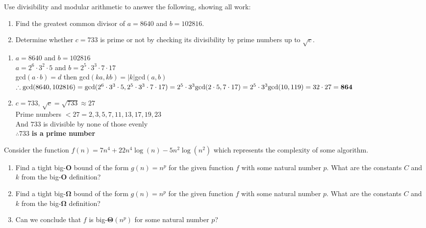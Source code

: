 \documentclass[11pt]{amsart}
\newcommand{\be}{\begin{enumerate}}
\newcommand{\ee}{\end{enumerate}}
\begin{document}
\item Use divisibility and modular arithmetic to answer the following, showing all work: 
	\be
		\item Find the greatest common divisor of $a=8640$ and $b=102816$.
		\item Determine whether $c=733$ is prime or not by checking its divisibility by prime numbers up to $\sqrt{c}$.
	\ee
	
	\begin{sol}
	\be
		\item
		$a=8640$ and $b=102816$\\
		$a=2^6 \cdot 3^2 \cdot 5$ and $b=2^5 \cdot 3^3 \cdot 7 \cdot 17$\\
		gcd$(a \cdot b) = d$ then gcd$(ka, kb) = |k|$gcd$(a,b)$\\
		$\therefore \text{gcd}(8640, 102816) = \text{gcd}(2^6 \cdot 3^3 \cdot 5, 2^5 \cdot 3^3 \cdot 7 \cdot 17)\\
		= 2^5 \cdot 3^3 \text{gcd}(2 \cdot 5, 7 \cdot 17)\\
		= 2^5 \cdot 3^3 \text{gcd}(10, 119)\\
		= 32 \cdot 27\\
		= \mathbf{864}$

		\item 
		$c = 733, \, \sqrt{c} = \sqrt{733} \approx 27$\\
		Prime numbers $< 27 = 2, 3, 5, 7, 11, 13, 17, 19, 23$\\
		And $733$ is divisible by none of those evenly\\
		$\therefore 733$ \textbf{is a prime number}
	\ee
	\end{sol}

\item Consider the function $f(n) = 7n^{4} + 22n^{4}\log{(n)} - 5n^{2}\log{(n^{2})}$ which represents the complexity of some algorithm. 

	\be
		\item Find a tight big-\textbf{O} bound of the form $g(n) = n^{p}$ for the given function $f$ with some natural number $p$. What are the constants $C$ and $k$ from the big-\textbf{O} definition?
		\item Find a tight big-\textbf{$\boldsymbol{\Omega}$} bound of the form $g(n) = n^{p}$ for the given function $f$ with some natural number $p$. What are the constants $C$ and $k$ from the big-\textbf{$\boldsymbol{\Omega}$} definition?
		\item Can we conclude that $f$ is big-\textbf{$\boldsymbol{\Theta} (n^{p})$} for some natural number $p$?	
	\ee
	
\end{document}
